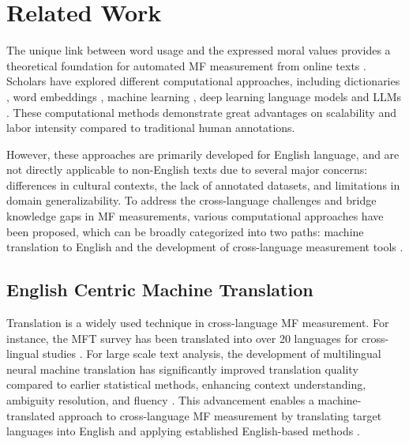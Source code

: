\section{Related Work}
The unique link between word usage and the expressed moral values provides a theoretical foundation for automated MF measurement from online texts \citep{brady2020mad, gantman2014moral, gantman2016see}. Scholars have explored different computational approaches, including dictionaries \citep{graham2009liberals, hopp2021extended}, word embeddings \citep{kwak2021frameaxis, araque2020moralstrength}, machine learning \citep{lan2022text}, deep learning language models \citep{preniqi2024moralbert, nguyen2024measuring} and LLMs \citep{rathje2024gpt}. These computational methods demonstrate great advantages on scalability and labor intensity compared to traditional human annotations. 

However, these approaches are primarily developed for English language, and are not directly applicable to non-English texts due to several major concerns: differences in cultural contexts, the lack of annotated datasets, and limitations in domain generalizability. To address the cross-language challenges and bridge knowledge gaps in MF measurements, various computational approaches have been proposed, which can be broadly categorized into two paths: machine translation to English and the development of cross-language measurement tools \citep{zhuang2020comprehensive}. 

\subsection{English Centric Machine Translation}
Translation is a widely used technique in cross-language MF measurement. For instance, the MFT survey has been translated into over 20 languages for cross-lingual studies \citep{yilmaz2016validation, nilsson2015moral}. For large scale text analysis, the development of multilingual neural machine translation has significantly improved translation quality compared to earlier statistical methods, enhancing context understanding, ambiguity resolution, and fluency \citep{stasimioti2020machine}. This advancement enables a machine-translated approach to cross-language MF measurement by translating target languages into English and applying established English-based methods \citep{artetxe2020translation}.



